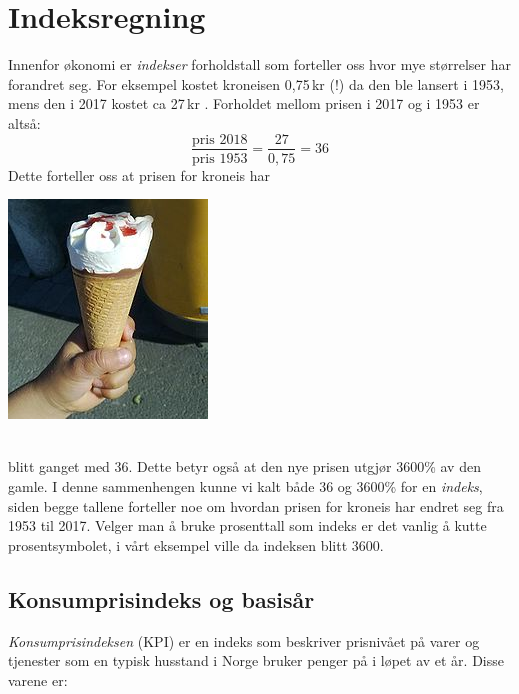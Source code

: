 




\newpage
\section{Indeksregning}
\parbox{0.6\linewidth}{Innenfor økonomi er \textit{indekser} forholdstall som forteller oss hvor mye størrelser har forandret seg. For eksempel kostet kroneisen 0,75\,kr (!) da den ble lansert i 1953, mens den i 2017 kostet ca 27\,kr . Forholdet mellom prisen i 2017 og i 1953 er altså:
	\[ \frac{\text{pris 2018}}{\text{pris 1953}}=\frac{27}{0,75}= 36 \]
Dette forteller oss at prisen for kroneis har
}
\parbox[r]{0.3\linewidth}{\includegraphics[scale=2]{kr}}\\[2pt]
blitt ganget med 36. Dette betyr også at den nye prisen utgjør 3600\% av den gamle. I denne sammenhengen kunne vi kalt både 36 og 3600\% for en \textit{indeks}, siden begge tallene forteller noe om hvordan prisen for kroneis har endret seg fra 1953 til 2017. Velger man å bruke prosenttall som indeks er det vanlig å kutte prosentsymbolet, i vårt eksempel ville da indeksen blitt 3600.

\subsection{Konsumprisindeks og basisår}
\textit{Konsumprisindeksen} (KPI) er en indeks som beskriver prisnivået på varer og tjenester som en typisk husstand i Norge bruker penger på i løpet av et år. Disse varene er:

